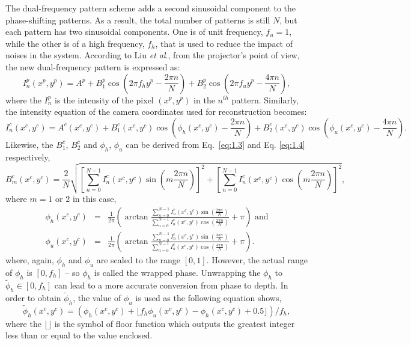 \documentclass[]{spie}  %
\begin{document}
The dual-frequency pattern scheme adds a second sinusoidal component to the phase-shifting patterns. As a result, the total number of patterns is still $N$, but each pattern has two sinusoidal components. One is of unit frequency, $f_u = 1$, while the other is of a high frequency, $f_h$, that is used to reduce the impact of noises in the system. According to Liu \textit{et al}., from the projector's point of view, the new dual-frequency pattern is expressed as:
\begin{equation} \label{eq:1.5}
I^p_n(x^p, y^p) = A^p + B^p_1\cos\left(2\pi f_h y^p - \frac{2\pi n}{N}\right) + B^p_2\cos\left(2\pi f_u y^p - \frac{4\pi n}{N}\right),
\end{equation}
where the $I^p_n$ is the intensity of the pixel $(x^p, y^p)$ in the $n^{th}$ pattern. Similarly, the intensity equation of the camera coordinates used for reconstruction becomes:
\begin{equation} \label{eq:1.6}
I^c_n(x^c, y^c) =  A^c(x^c, y^c) + B^c_1(x^c, y^c)\cos\left(\phi_h(x^c, y^c) - \frac{2\pi n}{N}\right) + B^c_2(x^c, y^c)\cos\left(\phi_u(x^c, y^c) - \frac{4\pi n}{N}\right).
\end{equation}
Likewise, the $B^c_1$, $B^c_2$ and $\phi_h$, $\phi_u$ can be derived from Eq.~\eqref{eq:1.3} and Eq. \eqref{eq:1.4} respectively,
\begin{equation} \label{eq:1.7}
B^c_m(x^c, y^c) = \frac{2}{N}\sqrt{\left[\sum_{n=0}^{N-1}I_n^c(x^c, y^c)\sin (m\frac{2\pi n}{N})\right]^2 + \left[\sum_{n=0}^{N-1}I_n^c(x^c, y^c)\cos (m\frac{2\pi n}{N})\right]^2},
\end{equation}
where $m = 1$ or $2$ in this case,
\begin{eqnarray}
\phi_h (x^c, y^c) & = & \frac{1}{2\pi}\left(\arctan \frac{\sum_{n=0}^{N-1} I^c_n(x^c, y^c)\sin(\frac{2\pi n}{N})}{\sum_{n=0}^{N-1} I^c_n(x^c, y^c)\cos(\frac{2\pi n}{N})} + \pi\right) \mbox{ and} \label{eq:1.8} \\
\phi_u (x^c, y^c) & = & \frac{1}{2\pi}\left(\arctan \frac{\sum_{n=0}^{N-1} I^c_n(x^c, y^c)\sin(\frac{4\pi n}{N})}{\sum_{n=0}^{N-1} I^c_n(x^c, y^c)\cos(\frac{4\pi n}{N})} + \pi\right). \label{eq:1.9}
\end{eqnarray}
where, again, $\phi_h$ and $\phi_u$ are scaled to the range $[0, 1]$. However, the actual range of $\phi_h$ is $[0, f_h]$ -- so $\phi_h$ is called the wrapped phase. Unwrapping the $\phi_h$ to $\tilde{\phi}_h \in [0, f_h]$ can lead to a more accurate conversion from phase to depth.  In order to obtain $\tilde{\phi}_h$, the value of $\phi_u$ is used as the following equation shows,
\begin{equation} \label{eq:1.10}
\tilde{\phi}_h(x^c, y^c) = \left( \phi_h(x^c, y^c) + \lfloor f_h \phi_u(x^c, y^c) - \phi_h(x^c, y^c) + 0.5 \rfloor \right)/f_h,
\end{equation}
where the $\lfloor \rfloor$ is the symbol of floor function which outputs the greatest integer less than or equal to the value enclosed.
\end{document}
